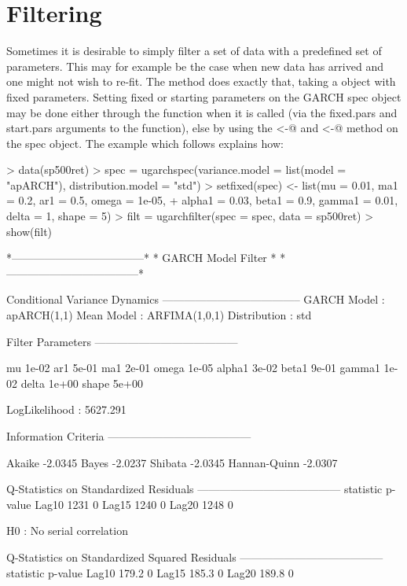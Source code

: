 \section{Filtering}\label{section:filtering}
Sometimes it is desirable to simply filter a set of data with a predefined set
of parameters. This may for example be the case when new data has arrived and
one might not wish to re-fit. The \verb@ugarchfilter@ method does exactly that,
taking a \verb@uGARCHspec@ object with fixed parameters. Setting fixed or
starting parameters on the GARCH spec object may be done either through the
\verb@ugarchspec@ function when it is called (via the fixed.pars and start.pars
arguments to the function), else by using the \verb@setfixed<-@ and \verb@setstart<-@
method on the spec object. The example which follows explains how:
\begin{Schunk}
\begin{Sinput}
> data(sp500ret)
> spec = ugarchspec(variance.model = list(model = "apARCH"), distribution.model = "std")
> setfixed(spec) <- list(mu = 0.01, ma1 = 0.2, ar1 = 0.5, omega = 1e-05,
+     alpha1 = 0.03, beta1 = 0.9, gamma1 = 0.01, delta = 1, shape = 5)
> filt = ugarchfilter(spec = spec, data = sp500ret)
> show(filt)
\end{Sinput}
\begin{Soutput}
*------------------------------------*
*          GARCH Model Filter        *
*------------------------------------*

Conditional Variance Dynamics
--------------------------------------
GARCH Model     : apARCH(1,1)
Mean Model      : ARFIMA(1,0,1)
Distribution    : std

Filter Parameters
---------------------------------------

mu     1e-02
ar1    5e-01
ma1    2e-01
omega  1e-05
alpha1 3e-02
beta1  9e-01
gamma1 1e-02
delta  1e+00
shape  5e+00

LogLikelihood : 5627.291

Information Criteria
---------------------------------------

Akaike       -2.0345
Bayes        -2.0237
Shibata      -2.0345
Hannan-Quinn -2.0307

Q-Statistics on Standardized Residuals
---------------------------------------
      statistic p-value
Lag10      1231       0
Lag15      1240       0
Lag20      1248       0

H0 : No serial correlation

Q-Statistics on Standardized Squared Residuals
---------------------------------------
      statistic p-value
Lag10     179.2       0
Lag15     185.3       0
Lag20     189.8       0


\end{Soutput}
\end{Schunk}
